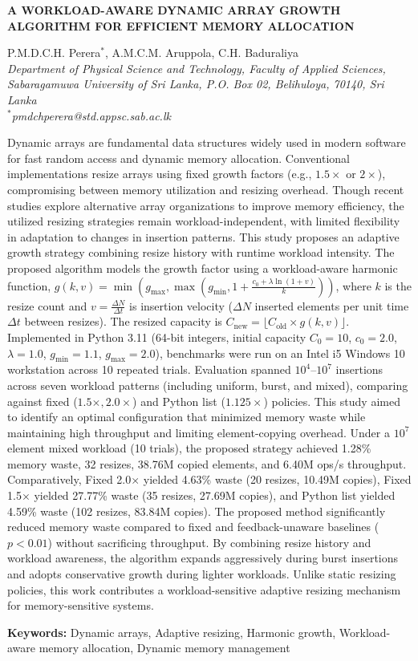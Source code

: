 \documentclass[11pt]{article}
\begin{document}
\begin{center}
\textbf{\uppercase{A Workload-Aware Dynamic Array Growth Algorithm for Efficient Memory Allocation}}

\vspace{0.5cm}

P.M.D.C.H. Perera$^*$, A.M.C.M. Aruppola, C.H. Baduraliya \\
\textit{Department of Physical Science and Technology, Faculty of Applied Sciences, Sabaragamuwa University of Sri Lanka, P.O. Box 02, Belihuloya, 70140, Sri Lanka}\\
\textit{$^*$pmdchperera@std.appsc.sab.ac.lk}
\end{center}

\vspace{0.5cm}

\noindent
Dynamic arrays are fundamental data structures widely used in modern software for fast random access and dynamic memory allocation. Conventional implementations resize arrays using fixed growth factors (e.g., $1.5\times$ or $2\times$), compromising between memory utilization and resizing overhead. Though recent studies explore alternative array organizations to improve memory efficiency, the utilized resizing strategies remain workload-independent, with limited flexibility in adaptation to changes in insertion patterns. This study proposes an adaptive growth strategy combining resize history with runtime workload intensity. The proposed algorithm models the growth factor using a workload-aware harmonic function, $g(k,v)= \min( g_{\max}, \max( g_{\min}, 1+\frac{c_0+\lambda\ln(1+v)}{k} ) )$, where $k$ is the resize count and $v = \frac{\Delta N}{\Delta t}$ is insertion velocity ($\Delta N$ inserted elements per unit time $\Delta t$ between resizes). The resized capacity is $C_{\mathrm{new}} = \lfloor C_{\mathrm{old}} \times g(k,v) \rfloor$. Implemented in Python 3.11 (64-bit integers, initial capacity $C_0=10$, $c_0=2.0$, $\lambda=1.0$, $g_{\min}=1.1$, $g_{\max}=2.0$), benchmarks were run on an Intel i5 Windows 10 workstation across 10 repeated trials. Evaluation spanned $10^4$--$10^7$ insertions across seven workload patterns (including uniform, burst, and mixed), comparing against fixed ($1.5\times, 2.0\times$) and Python list ($1.125\times$) policies. This study aimed to identify an optimal configuration that minimized memory waste while maintaining high throughput and limiting element-copying overhead. Under a $10^7$ element mixed workload (10 trials), the proposed strategy achieved 1.28\% memory waste, 32 resizes, 38.76M copied elements, and 6.40M ops/s throughput. Comparatively, Fixed 2.0$\times$ yielded 4.63\% waste (20 resizes, 10.49M copies), Fixed 1.5$\times$ yielded 27.77\% waste (35 resizes, 27.69M copies), and Python list yielded 4.59\% waste (102 resizes, 83.84M copies). The proposed method significantly reduced memory waste compared to fixed and feedback-unaware baselines ($p < 0.01$) without sacrificing throughput. By combining resize history and workload awareness, the algorithm expands aggressively during burst insertions and adopts conservative growth during lighter workloads. Unlike static resizing policies, this work contributes a workload-sensitive adaptive resizing mechanism for memory-sensitive systems.

\vspace{0.5cm}

\noindent \textbf{Keywords:} Dynamic arrays, Adaptive resizing, Harmonic growth, Workload-aware memory allocation, Dynamic memory management
\end{document}
